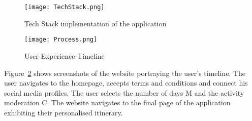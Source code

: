 \begin{figure}[h]
\centering
\texttt{[image: TechStack.png]}
\caption{Tech Stack implementation of the application}
\label{TechStack}
\end{figure}

\begin{figure}[h]
\centering
\texttt{[image: Process.png]}
\caption{User Experience Timeline}
\label{Timeline}
\end{figure}

Figure~\ref{Timeline} shows screenshots of the website portraying
the user's timeline.  The user navigates to the
homepage, accepts terms and conditions and connect his
social media profiles.  The user selects the number of
days M and the activity moderation C.  The website
navigates to the final page of the application
exhibiting their personalised itinerary. 

